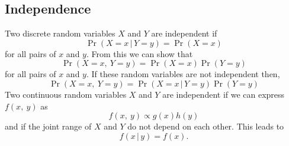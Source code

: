 \documentclass{article}
\begin{document}
\subsection{Independence}
Two discrete random variables \(X\) and \(Y\) are independent if
\begin{equation*}
    \Pr{\left( X = x \,\vert\, Y = y \right)} = \Pr{\left( X = x \right)}
\end{equation*}
for all pairs of \(x\) and \(y\). From this we can show that
\begin{equation*}
    \Pr{\left( X = x ,\: Y = y \right)} = \Pr{\left( X = x \right)} \Pr{\left( Y = y \right)}
\end{equation*}
for all pairs of \(x\) and \(y\). If these random variables are not independent then,
\begin{equation*}
    \Pr{\left( X = x ,\: Y = y \right)} = \Pr{\left( X = x \,\vert\, Y = y \right)} \Pr{\left( Y = y \right)}
\end{equation*}
Two continuous random variables \(X\) and \(Y\) are independent if we can express \(f\left( x,\: y \right)\) as
\begin{equation*}
    f\left( x,\: y \right) \propto g\left( x \right) h\left( y \right)
\end{equation*}
and if the joint range of \(X\) and \(Y\) do not depend on each other. This leads to
\begin{equation*}
    f\left( x \,\vert\, y \right) = f\left( x \right).
\end{equation*}
\end{document}
